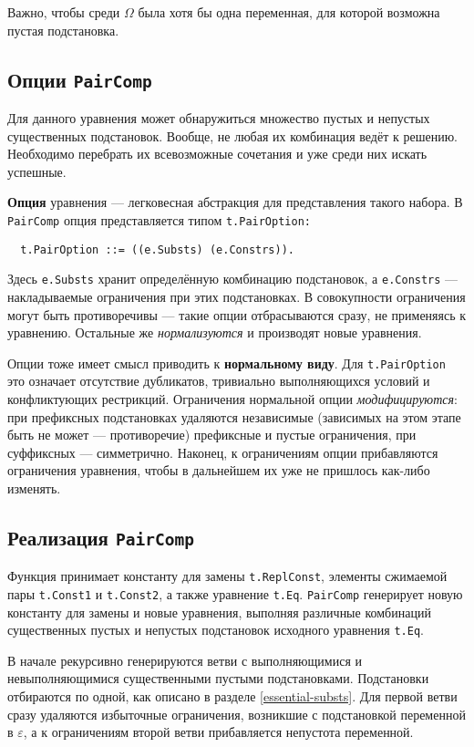 \documentclass[12pt]{article}
\begin{document}
Важно, чтобы среди $\Omega$ была хотя бы одна переменная, для которой возможна
пустая подстановка.


\subsection{Опции \texttt{PairComp}} \label{pair-option}

Для данного уравнения может обнаружиться множество пустых и непустых
существенных подстановок. Вообще, не любая их комбинация ведёт к решению.
Необходимо перебрать их всевозможные сочетания и уже среди них искать
успешные.

\textbf{Опция} уравнения --- легковесная абстракция для представления такого
набора. В \texttt{PairComp} опция представляется типом \texttt{t.PairOption:}
\begin{Verbatim}
  t.PairOption ::= ((e.Substs) (e.Constrs)).
\end{Verbatim}
Здесь \texttt{e.Substs} хранит определённую комбинацию подстановок, а
\texttt{e.Constrs} --- накладываемые ограничения при этих подстановках.
В совокупности ограничения могут быть противоречивы --- такие опции
отбрасываются сразу, не применяясь к уравнению. Остальные же
\textit{нормализуются} и производят новые уравнения.

Опции тоже имеет смысл приводить к \textbf{нормальному виду}. Для
\texttt{t.PairOption} это означает отсутствие дубликатов, тривиально
выполняющихся условий и конфликтующих рестрикций. Ограничения нормальной
опции \textit{модифицируются}: при префиксных подстановках удаляются
независимые (зависимых на этом этапе быть не может --- противоречие)
префиксные и пустые ограничения, при суффиксных --- симметрично. Наконец,
к ограничениям опции прибавляются ограничения уравнения, чтобы в дальнейшем
их уже не пришлось как-либо изменять.


\subsection{Реализация \texttt{PairComp}}

Функция принимает константу для замены \texttt{t.ReplConst}, элементы сжимаемой
пары \texttt{t.Const1} и \texttt{t.Const2}, а также уравнение \texttt{t.Eq}.
\texttt{PairComp} генерирует новую константу для замены и новые уравнения,
выполняя различные комбинаций существенных пустых и непустых подстановок
исходного уравнения \texttt{t.Eq}.

В начале рекурсивно генерируются ветви с выполняющимися и невыполняющимися
существенными пустыми подстановками. Подстановки отбираются по одной, как
описано в разделе \ref{essential-substs}. Для первой ветви сразу удаляются
избыточные ограничения, возникшие с подстановкой переменной в $\varepsilon$,
а к ограничениям второй ветви прибавляется непустота переменной.
\end{document}
